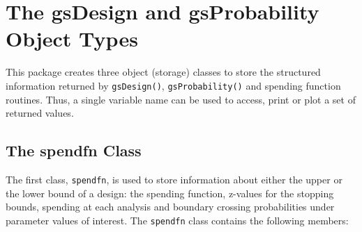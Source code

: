 \section{The gsDesign and gsProbability Object Types\label{sec:objtypes}}

This package creates three object (storage) classes to store the structured
information returned by \texttt{gsDesign()}, \texttt{gsProbability()} and
spending function routines. Thus, a single variable name can be used to
access, print or plot a set of returned values. \bigskip

\subsection{The spendfn Class\label{sec:spendfn}}

\bigskip

The first class, \texttt{spendfn}, is used to store information about either 
the upper or the lower bound of a design: the spending function, z-values for 
the stopping bounds, spending at each analysis and boundary crossing 
probabilities under parameter values of interest. The \texttt{spendfn} class
contains the following members:

